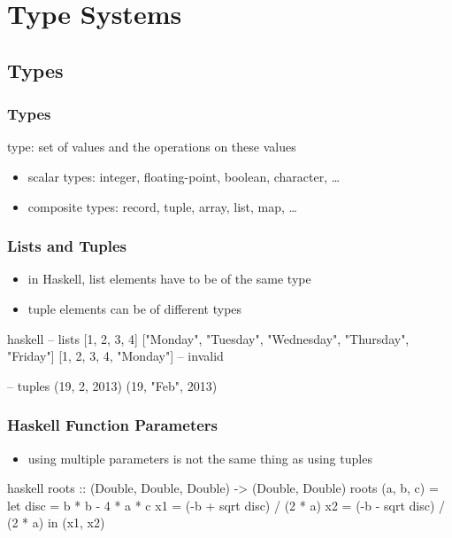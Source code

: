 \documentclass[dvipsnames]{beamer}
\theoremstyle{plain}
\begin{document}
\section{Type Systems}

\subsection{Types}

\begin{frame}
  \frametitle{Types}

  \begin{definition}
    \alert{type}: set of values and the operations on these values
  \end{definition}

  \pause
  \medskip
  \begin{itemize}
    \item scalar types: integer, floating-point, boolean, character, \ldots
    \item composite types: record, tuple, array, list, map, \ldots
  \end{itemize}
\end{frame}

\begin{frame}[fragile]
  \frametitle{Lists and Tuples}

  \begin{itemize}
    \item in Haskell, list elements have to be of the same type
    \item tuple elements can be of different types
  \end{itemize}

  \pause
  \begin{example}[Haskell]
    \begin{pygments}{haskell}
-- lists
[1, 2, 3, 4]
["Monday", "Tuesday", "Wednesday", "Thursday", "Friday"]
[1, 2, 3, 4, "Monday"]  -- invalid

-- tuples
(19, 2, 2013)
(19, "Feb", 2013)
    \end{pygments}
  \end{example}
\end{frame}

\begin{frame}[fragile]
  \frametitle{Haskell Function Parameters}

  \begin{itemize}
    \item using multiple parameters is not the same thing as using tuples
  \end{itemize}

  \begin{example}[Haskell]
    \begin{pygments}{haskell}
roots :: (Double, Double, Double) -> (Double, Double)
roots (a, b, c) =
    let
        disc = b * b - 4 * a * c
        x1 = (-b + sqrt disc) / (2 * a)
        x2 = (-b - sqrt disc) / (2 * a)
    in
        (x1, x2)
    \end{pygments}
  \end{example}
\end{frame}
\end{document}
